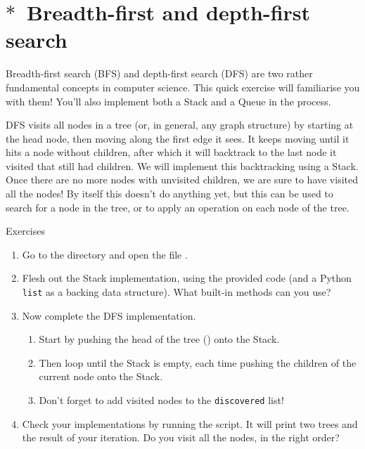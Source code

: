 \section{$\ast$~Breadth-first and depth-first search}

Breadth-first search (BFS) and depth-first search (DFS) are two rather fundamental concepts in computer science. This quick exercise will familiarise you with them! You'll also implement both a Stack and a Queue in the process.

DFS visits all nodes in a tree (or, in general, any graph structure) by starting at the head node, then moving along the first edge it sees. It keeps moving until it hits a node without children, after which it will backtrack to the last node it visited that still had children. We will implement this backtracking using a Stack. Once there are no more nodes with unvisited children, we are sure to have visited all the nodes! By itself this doesn't do anything yet, but this can be used to search for a node in the tree, or to apply an operation on each node of the tree.
%
\begin{mybox}{Exercises}
    \begin{enumerate}
        \item Go to the directory  and open the file .
        \item Flesh out the Stack implementation, using the provided code (and a Python \texttt{list} as a backing data structure). What built-in methods can you use?
        \item Now complete the DFS implementation.
        \begin{enumerate}
            \item Start by pushing the head of the tree () onto the Stack.
            \item Then loop until the Stack is empty, each time pushing the children of the current node onto the Stack.
            \item Don't forget to add visited nodes to the \texttt{discovered} list!
        \end{enumerate}
        \item Check your implementations by running the script. It will print two trees and the result of your iteration. Do you visit all the nodes, in the right order?
    \end{enumerate}
\end{mybox}
\clearpage


